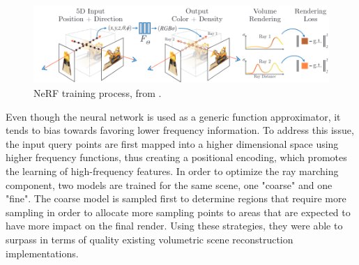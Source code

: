 \begin{figure}[H]
    \centering
    \includegraphics[width=0.7\linewidth]{figures/nerf.png}
    \caption{NeRF training process, from \cite{mildenhall2020nerf}.}
    \label{fig:nerf}
\end{figure}

Even though the neural network is used as a generic function approximator, it tends to bias towards favoring lower frequency information. To address this issue, the input query points are first mapped into a higher dimensional space using higher frequency functions, thus creating a positional encoding, which promotes the learning of high-frequency features. In order to optimize the ray marching component, two models are trained for the same scene, one "coarse" and one "fine". The coarse model is sampled first to determine regions that require more sampling in order to allocate more sampling points to areas that are expected to have more impact on the final render. Using these strategies, they were able to surpass in terms of quality existing volumetric scene reconstruction implementations.

